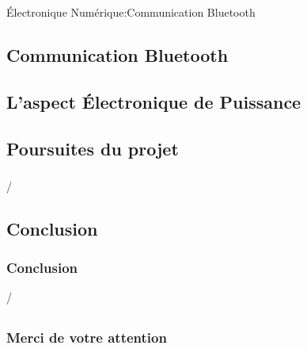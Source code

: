 \documentclass{beamer}
\begin{document}
	\begin{frame}{Électronique Numérique:Communication Bluetooth}
		\subsection[Bluetooth]{Communication Bluetooth}
	
	\end{frame}
	\begin{frame}
		\section[ENPU]{L'aspect Électronique de Puissance}
		
		
	\end{frame}
	\begin{frame}
		\section[Poursuites]{Poursuites du projet}
		\frametitle{}
		\insertframenumber/\inserttotalframenumber
	\end{frame}
	
	\begin{frame}
	\section*{Conclusion}
	\frametitle{Conclusion}
	\insertframenumber/\inserttotalframenumber
	\end{frame}
	\begin{frame}
	\section*{}
		\frametitle{Merci de votre attention}
		\titlepage
	\end{frame}
\end{document}
